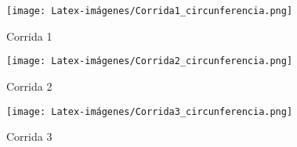 \begin {figure}[h!]
\centerline{\texttt{[image: Latex-imágenes/Corrida1\_circunferencia.png]}}
\caption{Corrida 1}
\label{fig}
\end {figure}

\begin {figure}[h!]
\centerline{\texttt{[image: Latex-imágenes/Corrida2\_circunferencia.png]}}
\caption{Corrida 2}
\label{fig}
\end {figure}

\begin {figure}[h!]
\centerline{\texttt{[image: Latex-imágenes/Corrida3\_circunferencia.png]}}
\caption{Corrida 3}
\label{fig}
\end {figure}